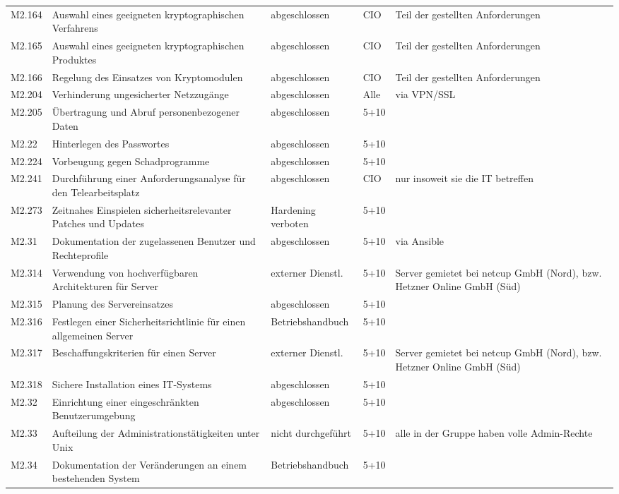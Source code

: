 \begin{longtable}{lp{3.7cm}p{3cm}lp{3.8cm}}
M2.164 & Auswahl eines geeigneten kryptographischen Verfahrens & abgeschlossen & CIO & Teil der gestellten Anforderungen \\
M2.165 & Auswahl eines geeigneten kryptographischen Produktes & abgeschlossen & CIO & Teil der gestellten Anforderungen \\
M2.166 & Regelung des Einsatzes von Kryptomodulen & abgeschlossen & CIO & Teil der gestellten Anforderungen \\
M2.204 & Verhinderung ungesicherter Netzzugänge & abgeschlossen & Alle & via VPN/SSL \\
M2.205 & Übertragung und Abruf personenbezogener Daten & abgeschlossen & 5+10 &  \\
M2.22 & Hinterlegen des Passwortes & abgeschlossen & 5+10 &  \\
M2.224 & Vorbeugung gegen Schadprogramme & abgeschlossen & 5+10 &  \\
M2.241 & Durchführung einer Anforderungsanalyse für den Telearbeitsplatz & abgeschlossen & CIO & nur insoweit sie die IT betreffen \\
M2.273 & Zeitnahes Einspielen sicherheitsrelevanter Patches und Updates & Hardening verboten & 5+10 &  \\
M2.31 & Dokumentation der zugelassenen Benutzer und Rechteprofile & abgeschlossen & 5+10 & via Ansible \\
M2.314 & Verwendung von hochverfügbaren Architekturen für Server & externer Dienstl. & 5+10 & Server gemietet bei netcup GmbH (Nord), bzw. Hetzner Online GmbH (Süd) \\
M2.315 & Planung des Servereinsatzes & abgeschlossen & 5+10 &  \\
M2.316 & Festlegen einer Sicherheitsrichtlinie für einen allgemeinen Server & Betriebshandbuch & 5+10 &  \\
M2.317 & Beschaffungskriterien für einen Server & externer Dienstl. & 5+10 & Server gemietet bei netcup GmbH (Nord), bzw. Hetzner Online GmbH (Süd) \\
M2.318 & Sichere Installation eines IT-Systems & abgeschlossen & 5+10 &  \\
M2.32 & Einrichtung einer eingeschränkten Benutzerumgebung & abgeschlossen & 5+10 &  \\
M2.33 & Aufteilung der Administrationstätigkeiten unter Unix & nicht durchgeführt & 5+10 & alle in der Gruppe haben volle Admin-Rechte \\
M2.34 & Dokumentation der Veränderungen an einem bestehenden System & Betriebshandbuch & 5+10 &  \\

\end{longtable}
